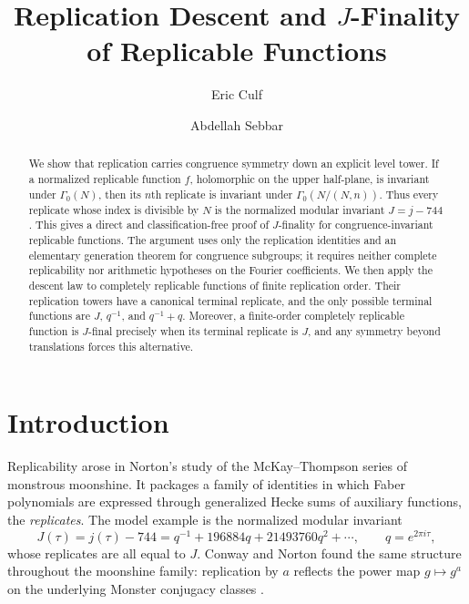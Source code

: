 \documentclass[12pt]{amsart}
\theoremstyle{definition}
\theoremstyle{remark}
\numberwithin{equation}{section}
\begin{document}
\title[Replication descent and $J$-finality]{Replication Descent and $J$-Finality of Replicable Functions}
\author{Eric Culf}
\author{Abdellah Sebbar}

\address{Institute for Quantum Computing, University of Waterloo}
\address{Department of Mathematics and Statistics, University of Ottawa}




\begin{abstract}
We show that replication carries congruence symmetry down an explicit level
tower.  If a normalized replicable function $f$, holomorphic on the upper
half-plane, is invariant under $\Gamma_0(N)$, then its $n$th replicate is
invariant under $\Gamma_0(N/(N,n))$.  Thus every replicate whose index is
divisible by $N$ is the normalized modular invariant $J=j-744$.  This gives a
direct and classification-free proof of $J$-finality for congruence-invariant
replicable functions.  The argument uses only the replication identities and
an elementary generation theorem for congruence subgroups; it requires neither
complete replicability nor arithmetic hypotheses on the Fourier coefficients.
We then apply the descent law to completely replicable functions of finite
replication order.  Their replication towers have a canonical terminal
replicate, and the only possible terminal functions are
$J$, $q^{-1}$, and $q^{-1}+q$.  Moreover, a finite-order completely replicable
function is $J$-final precisely when its terminal replicate is $J$, and any
symmetry beyond translations forces this alternative.
\end{abstract}

\maketitle

\section{Introduction}

Replicability arose in Norton's study of the McKay--Thompson series of
monstrous moonshine.  It packages a family of identities in which Faber
polynomials are expressed through generalized Hecke sums of auxiliary
functions, the \emph{replicates}.  The model example is the normalized modular
invariant
\[
J(\tau)=j(\tau)-744=q^{-1}+196884q+21493760q^2+\cdots,
\qquad q=e^{2\pi i\tau},
\]
whose replicates are all equal to $J$.  Conway and Norton found the same
structure throughout the moonshine family: replication by $a$ reflects the
power map $g\mapsto g^a$ on the underlying Monster conjugacy classes
\cite{conway-norton,norton}.
\end{document}
